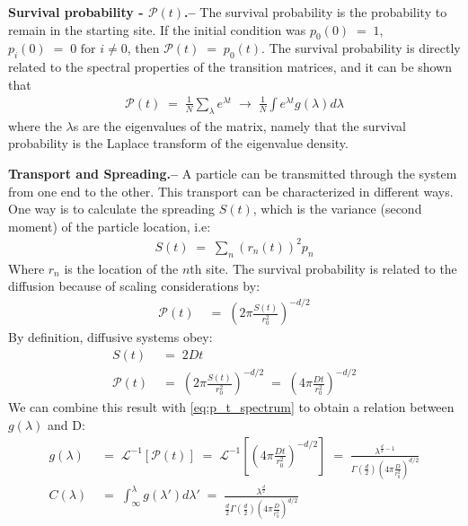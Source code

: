 \documentclass[onecolumn,fleqn,notitlepage,secnumarabic]{revtex4}
\begin{document}
{ \bf Survival probability - $\mathcal{P}(t)$.--} 
The survival probability is the probability to remain in the starting site. If the initial condition was $p_0(0)\;=\;1$, $p_i(0)\;=\;0 \textrm{  for  } i\neq 0$, then $\mathcal{P}(t)\;=\; p_0(t)$. The survival probability is directly related to the spectral properties of the transition matrices, and it can be shown that 
\begin{align} \label{eq:p_t_spectrum}
\mathcal{P}(t) \;=\; \frac{1}{N}\sum_\lambda e^{\lambda t} \;\rightarrow\;\frac{1}{N}\int e^{\lambda t}g(\lambda)d\lambda
\end{align}
where the $\lambda$s are the eigenvalues of the matrix, namely that the survival probability is the Laplace transform of the eigenvalue density.

{ \bf Transport and Spreading.--}  %
A particle can be transmitted through the system from one end to the other. This transport can be characterized in different ways. One way is to calculate the spreading $S(t)$, which is the variance (second moment) of the particle location, i.e:
\begin{align}
  S(t) \;=\; \sum_n \left(r_n(t)\right)^2 p_n  %
\end{align}
Where $r_n$ is the location of the $n$th site. The survival probability is related to the diffusion because of scaling considerations by:
\begin{align}
\mathcal{P}(t) &\;=\; \left(2\pi \frac{S(t)}{r_0^2}\right)^{-d/2}
\end{align}
By definition, diffusive systems obey: 
\begin{align}
S(t) &\;=\; 2Dt  \\
\mathcal{P}(t) &\;=\; \left(2\pi \frac{S(t)}{r_0^2}\right)^{-d/2} \;=\; \left(4\pi \frac{Dt}{r_0^2} \right)^{-d/2}
\end{align}
We can combine this result with \autoref{eq:p_t_spectrum} to obtain a relation between $g(\lambda)$ and D:
\begin{align}
    g(\lambda) &\;=\; \mathcal{L}^{-1}[\mathcal{P}(t)] \;=\; \mathcal{L}^{-1}\left[ \left(4\pi \frac{Dt}{r_0^2} \right)^{-d/2}\right] \;=\; \frac{\lambda^{\frac{d}{2}-1}}{\Gamma\left(\frac{d}{2}\right)\left(4\pi \frac{D}{r_0^2}\right)^{d/2}}  \\
    C(\lambda) &\;=\; \int_{\infty}^{\lambda} g(\lambda')d\lambda' \;=\; \frac{\lambda^{\frac{d}{2}}}{\frac{d}{2}\Gamma\left(\frac{d}{2}\right)\left(4\pi \frac{D}{r_0^2}\right)^{d/2}}
\label{eq:C_D}
\end{align}
\end{document}
